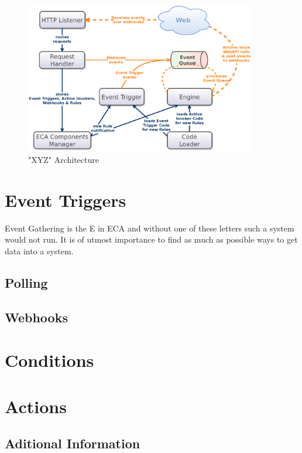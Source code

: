 \begin{figure}[!ht]
	\centering
  \includegraphics[width=0.9\textwidth]{figures/Architecture_wET}
	\caption{"XYZ" Architecture}
	\label{fig:Architecture_wET}
\end{figure}


\section{Event Triggers}

Event Gathering is the E in ECA and without one of these letters such a system would not run.
It is of utmost importance to find as much as possible ways to get data into a system.



\subsection{Polling}



\subsection{Webhooks}




\section{Conditions}




\section{Actions}

\subsection{Aditional Information}

